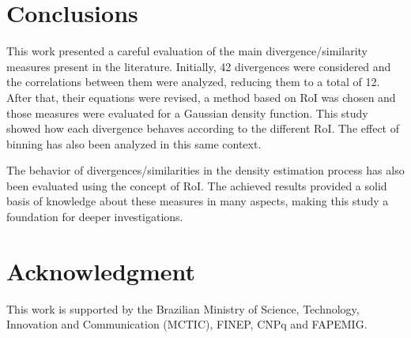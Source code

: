 \documentclass[conference]{IEEEtran}
\begin{document}
\section{Conclusions}\label{conclusao}

This work presented a careful evaluation of the main divergence/similarity measures present in the literature. Initially, 42 divergences were considered and the correlations between them were analyzed, reducing them to a total of 12. After that, their equations were revised, a method based on RoI was chosen and those measures were evaluated for a Gaussian density function. This study showed how each divergence behaves according to the different RoI. The effect of binning has also been analyzed in this same context.

The behavior of divergences/similarities in the density estimation process has also been evaluated using the concept of RoI. The achieved results provided a solid basis of knowledge about these measures in many aspects, making this study a foundation for deeper investigations.

\section*{Acknowledgment}


This work is supported by the Brazilian Ministry of Science, Technology, Innovation and Communication (MCTIC), FINEP, CNPq and FAPEMIG.

\ifCLASSOPTIONcaptionsoff
  \newpage
\fi





\end{document}
